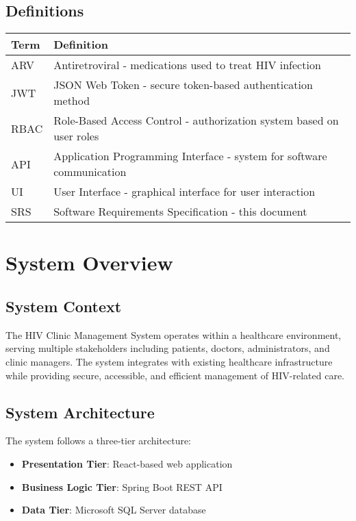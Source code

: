 \documentclass[12pt,a4paper]{article}
\begin{document}
\subsection{Definitions}

\begin{longtable}{|p{3cm}|p{11cm}|}
\hline
\textbf{Term} & \textbf{Definition} \\
\hline
ARV & Antiretroviral - medications used to treat HIV infection \\
\hline
JWT & JSON Web Token - secure token-based authentication method \\
\hline
RBAC & Role-Based Access Control - authorization system based on user roles \\
\hline
API & Application Programming Interface - system for software communication \\
\hline
UI & User Interface - graphical interface for user interaction \\
\hline
SRS & Software Requirements Specification - this document \\
\hline
\end{longtable}

\section{System Overview}

\subsection{System Context}

The HIV Clinic Management System operates within a healthcare environment, serving multiple stakeholders including patients, doctors, administrators, and clinic managers. The system integrates with existing healthcare infrastructure while providing secure, accessible, and efficient management of HIV-related care.

\subsection{System Architecture}

The system follows a three-tier architecture:

\begin{itemize}
    \item \textbf{Presentation Tier}: React-based web application
    \item \textbf{Business Logic Tier}: Spring Boot REST API
    \item \textbf{Data Tier}: Microsoft SQL Server database
\end{itemize}
\end{document}
